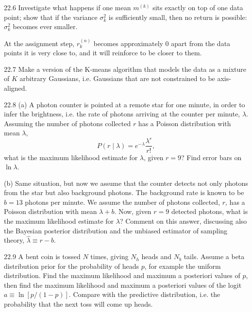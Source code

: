 \documentclass[12pt, a4paper]{article}
\begin{document}
\begin{prob}{22.6}
Investigate what happens if one mean $m^{(k)}$ sits exactly on top of one data point; show that if the variance $\sigma_k^2$ is sufficiently small, then no return is possible: $\sigma_k^2$ becomes ever smaller.
\end{prob}
\begin{sol}
At the assignment step, $r_k^{(n)}$ becomes approximately 0 apart from the data points it is very close to, and it will reinforce to be closer to them.
\end{sol}
\bigskip

\begin{prob}{22.7}
Make a version of the K-means algorithm that models the data as a mixture of $K$ arbitrary Gaussians, i.e. Gaussians that are not constrained to be axis-aligned.
\end{prob}
\begin{sol}
\end{sol}
\bigskip

\begin{prob}{22.8}
(a) A photon counter is pointed at a remote star for one minute, in order to infer the brightness, i.e. the rate of photons arriving at the counter per minute, $\lambda$. Assuming the number of photons collected $r$ has a Poisson distribution with mean $\lambda$,
\[
P(r \mid \lambda) = e^{-\lambda}\frac{\lambda^r}{r!},
\]
what is the maximum likelihood estimate for $\lambda$, given $r=9$? Find error bars on $\ln\lambda$.

(b) Same situation, but now we assume that the counter detects not only photons from the star but also background photons. The background rate is known to be $b=13$ photons per minute. We assume the number of photons collected, $r$, has a Poisson distribution with mean $\lambda + b$. Now, given $r=9$ detected photons, what is the maximum likelihood estimate for $\lambda$? Comment on this answer, discussing also the Bayesian posterior distribution and the unbiased estimator of sampling theory, $\hat{\lambda} \equiv r-b$.
\end{prob}
\begin{sol}
\end{sol}
\bigskip

\begin{prob}{22.9}
A bent coin is tossed $N$ times, giving $N_h$ heads and $N_b$ tails. Assume a beta distribution prior for the probability of heads $p$, for example the uniform distribution. Find the maximum likelihood and maximum a posteriori values of $p$, then find the maximum likelihood and maximum a posteriori values of the logit $a \equiv \ln[p/(1-p)]$. Compare with the predictive distribution, i.e. the probability that the next toss will come up heads.
\end{prob}
\begin{sol}
\end{sol}
\bigskip
\end{document}
